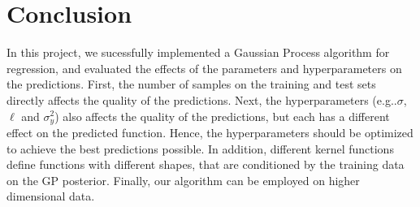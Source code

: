 \documentclass{article}
\makeatletter
\DeclareRobustCommand\onedot{\futurelet\@let@token\@onedot}
\def\@onedot{\ifx\@let@token.\else.\null\fi\xspace}
\def\eg{e.g\onedot} \def\Eg{E.g\onedot}
\makeatother
\begin{document}
\section{Conclusion}

In this project, we sucessfully implemented a Gaussian Process algorithm for regression, and evaluated the effects of the parameters and hyperparameters on the predictions. First, the number of samples on the training and test sets directly affects the quality of the predictions. Next, the hyperparameters (\eg $\sigma$, $\ell$ and $\sigma_y^2$) also affects the quality of the predictions, but each has a different effect on the predicted function. Hence, the hyperparameters should be optimized to achieve the best predictions possible. In addition, different kernel functions define functions with different shapes, that are conditioned by the training data on the GP posterior. Finally, our algorithm can be employed on higher dimensional data.
 
\printbibliography
\end{document}
